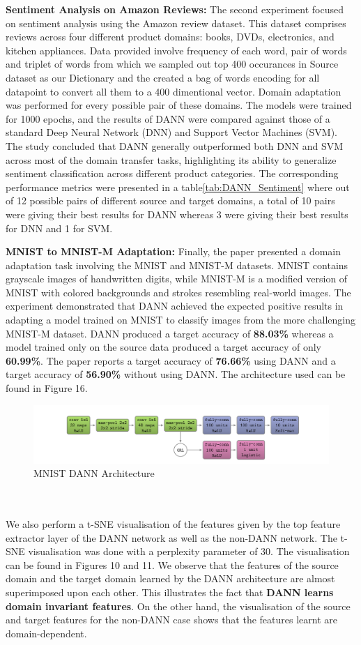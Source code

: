 \documentclass{article}
\begin{document}
\textbf{Sentiment Analysis on Amazon Reviews:}
The second experiment focused on sentiment analysis using the Amazon review dataset. This dataset comprises reviews across four different product domains: books, DVDs, electronics, and kitchen appliances. Data provided involve frequency of each word, pair of words and triplet of words from which we sampled out top 400 occurances in Source dataset as our Dictionary and the created a bag of words encoding for all datapoint to convert all them to a 400 dimentional vector. Domain adaptation was performed for every possible pair of these domains. The models were trained for 1000 epochs, and the results of DANN were compared against those of a standard Deep Neural Network (DNN) and Support Vector Machines (SVM). The study concluded that DANN generally outperformed both DNN and SVM across most of the domain transfer tasks, highlighting its ability to generalize sentiment classification across different product categories. The corresponding performance metrics were presented in a table\ref{tab:DANN_Sentiment} where out of 12 possible pairs of different source and target domains, a total of 10 pairs were giving their best results for DANN whereas 3 were giving their best results for DNN and 1 for SVM.

\textbf{MNIST to MNIST-M Adaptation:}
Finally, the paper presented a domain adaptation task involving the MNIST and MNIST-M datasets. MNIST contains grayscale images of handwritten digits, while MNIST-M is a modified version of MNIST with colored backgrounds and strokes resembling real-world images. The experiment demonstrated that DANN achieved the expected positive results in adapting a model trained on MNIST to classify images from the more challenging MNIST-M dataset. DANN produced a target accuracy of \textbf{88.03\% } whereas a model trained only on the source data produced a target accuracy of only \textbf{60.99\%}. The paper reports a target accuracy of \textbf{76.66\%} using DANN and a target accuracy of \textbf{56.90\%} without using DANN. The architecture used can be found in Figure 16.
\begin{figure}
    \centering
    \includegraphics[width=0.8\linewidth]{images/DANN/mnist.png}
    \caption{MNIST DANN Architecture}
    \label{fig:enter-label}
\end{figure}
\\
\\
We also perform a t-SNE visualisation of the features given by the top feature extractor layer of the DANN network as well as the non-DANN network. The t-SNE visualisation was done with a perplexity parameter of 30. The visualisation can be found in Figures 10 and 11. We observe that the features of the source domain and the target domain learned by the DANN architecture are almost superimposed upon each other. This illustrates the fact that \textbf{DANN learns domain invariant features}. On the other hand, the visualisation of the source and target features for the non-DANN case shows that the features learnt are domain-dependent. 
\end{document}
